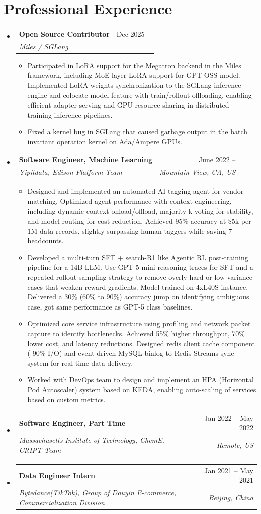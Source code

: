 \documentclass[letterpaper,11pt]{article}
\makeatletter
\newcommand{\resumeItem}[1]{
  \item\small{
    {#1 \vspace{-2pt}}
  }
}
\newcommand{\resumeSubheading}[4]{
  \vspace{-2pt}\item
    \begin{tabular*}{0.97\textwidth}[t]{l@{\extracolsep{\fill}}r}
      \textbf{#1} & #2 \\
      \textit{\small#3} & \textit{\small #4} \\
    \end{tabular*}\vspace{-7pt}
}
\newcommand{\resumeSubHeadingListStart}{\begin{itemize}[leftmargin=0.15in, label={}]}
\newcommand{\resumeSubHeadingListEnd}{\end{itemize}}
\newcommand{\resumeItemListStart}{\begin{itemize}}
\newcommand{\resumeItemListEnd}{\end{itemize}\vspace{-5pt}}
\makeatother
\begin{document}
\section{Professional Experience}
  \resumeSubHeadingListStart
    \resumeSubheading
      {Open Source Contributor}{Dec 2025 -- }
      {Miles / SGLang}{}
      \resumeItemListStart
        \resumeItem{Participated in LoRA support for the Megatron backend in the Miles framework, including MoE layer LoRA support for GPT-OSS model. Implemented LoRA weights synchronization to the SGLang inference engine and colocate model feature with train/rollout offloading, enabling efficient adapter serving and GPU resource sharing in distributed training-inference pipelines.}
        \resumeItem{Fixed a kernel bug in SGLang that caused garbage output in the batch invariant operation kernel on Ada/Ampere GPUs.}
      \resumeItemListEnd
    \resumeSubheading
      {Software Engineer, Machine Learning}{June 2022 -- }
      {Yipitdata, Edison Platform Team}{Mountain View, CA, US}
      \resumeItemListStart
      \resumeItem{Designed and implemented an automated AI tagging agent for vendor matching. Optimized agent performance with context engineering, including dynamic context onload/offload, majority-k voting for stability, and model routing for cost reduction. Achieved 95\% accuracy at \$5k per 1M data records, slightly surpassing human taggers while saving 7 headcounts.}
      \resumeItem{Developed a multi-turn SFT + search-R1 like Agentic RL post-training pipeline for a 14B LLM. Use GPT-5-mini reasoning traces for SFT and a repeated rollout sampling strategy to remove overly hard or low-variance cases that weaken reward gradients. Model trained on 4xL40S instance. Delivered a 30\% (60\% to 90\%) accuracy jump on identifying ambiguous case, got same performance as GPT-5 class baselines.}
      \resumeItem{Optimized core service infrastructure using profiling and network packet capture to identify bottlenecks. Achieved 55\% higher throughput, 70\% lower cost, and latency reductions. Designed redis client cache component (-90\% I/O) and event-driven MySQL binlog to Redis Streams sync system for real-time data delivery.}
      \resumeItem{Worked with DevOps team to design and implement an HPA (Horizontal Pod Autoscaler) system based on KEDA, enabling auto-scaling of services based on custom metrics.}
      \resumeItemListEnd
    \resumeSubheading
      {Software Engineer, Part Time}{Jan 2022 -- May 2022}
      {Massachusetts Institute of Technology, ChemE, CRIPT Team}{Remote, US}
    \resumeSubheading
      {Data Engineer Intern}{Jan 2021 -- May 2021}
      {Bytedance(TikTok), Group of Douyin E-commerce, Commercialization Division}{Beijing, China}
  \resumeSubHeadingListEnd
\end{document}
